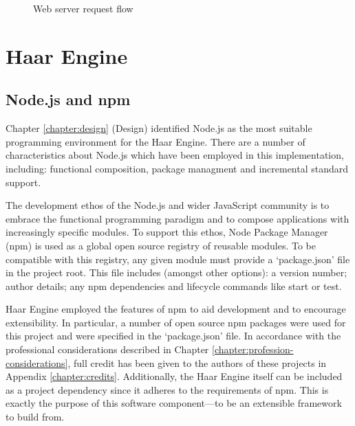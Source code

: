     \begin{figure}
      \centering
      \caption{Web server request flow}
      \label{figure:reverse-proxy}
    \end{figure}

  \section{Haar Engine}

    \subsection{Node.js and npm}
      Chapter \ref{chapter:design} (Design) identified Node.js as the most suitable programming environment for the Haar Engine. There are a number of characteristics  about Node.js which have been employed in this implementation, including: functional composition, package managment and incremental standard support.

      The development ethos of the Node.js and wider JavaScript community is to embrace the functional programming paradigm and to compose applications with increasingly specific modules. To support this ethos, Node Package Manager (npm) is used as a global open source registry of reusable modules. To be compatible with this registry, any given module must provide a `package.json' file in the project root. This file includes (amongst other options): a version number; author details; any npm dependencies and lifecycle commands like start or test.

      Haar Engine employed the features of npm to aid development and to encourage extensibility. In particular, a number of open source npm packages were used for this project and were specified in the `package.json' file. In accordance with the professional considerations described in Chapter \ref{chapter:profession-considerations}, full credit has been given to the authors of these projects in Appendix \ref{chapter:credits}. Additionally, the Haar Engine itself can be included as a project dependency since it adheres to the requirements of npm. This is exactly the purpose of this software component---to be an extensible framework to build from.

